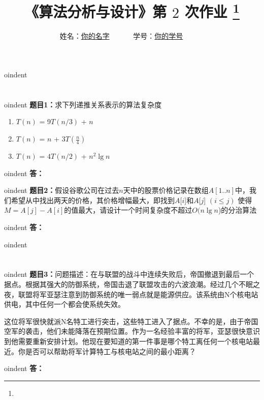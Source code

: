 \documentclass[12pt,a4paper]{article}
\begin{document}
\title{
{\heiti《算法分析与设计》第 {$2$} 次作业
\footnote{
}
}
}
\date{}

\author{
姓名：\underline{你的名字}~~~~~~
学号：\underline{你的学号}~~~~~~}

\maketitle


oindent
\section*{\heiti \color{red}{算法分析题}}

oindent
{\bf 题目1：}求下列递推关系表示的算法复杂度
\begin{enumerate}
\item[(1)]  $T(n)$ = 9$T(n/3)$ + $n$
\item[(2)] $T(n)$ = $n$ + $3T(\frac{n}{4})$
\item[(3)] $T(n)$ = $4T(n/2)$ + $n^2\lg{n}$
\end{enumerate}


\vspace{5pt}

oindent
{\bf 答：}

\vspace{10pt}

oindent
{\bf 题目2：}假设谷歌公司在过去$n$天中的股票价格记录在数组$A[1..n]$中，我们希望从中找出两天的价格，其价格增幅最大，即找到$A$[$i$]和$A$[$j$] $(i\leq j)$ 使得$M=A[j]-A[i]$的值最大，请设计一个时间复杂度不超过$O(n\lg{n}$)的分治算法

\vspace{5pt}

oindent
{\bf 答：}

oindent
\section*{\heiti \color{red}{算法实现题}}
\vspace{10pt}

oindent
{\bf 题目3：}问题描述：在与联盟的战斗中连续失败后，帝国撤退到最后一个据点。根据其强大的防御系统，帝国击退了联盟攻击的六波浪潮。经过几个不眠之夜，联盟将军亚瑟注意到防御系统的唯一弱点就是能源供应。该系统由N个核电站供电，其中任何一个都会使系统失效。

这位将军很快就派N名特工进行突击，这些特工进入了据点。不幸的是，由于帝国空军的袭击，他们未能降落在预期位置。作为一名经验丰富的将军，亚瑟很快意识到他需要重新安排计划。他现在要知道的第一件事是哪个特工离任何一个核电站最近。你是否可以帮助将军计算特工与核电站之间的最小距离？


\vspace{5pt}

oindent
{\bf 答：}
\end{document}
